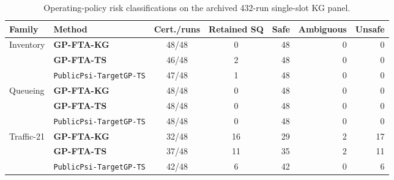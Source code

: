 \begin{table}[htbp]
\centering
\caption{Operating-policy risk classifications on the archived 432-run single-slot KG panel.}\label{tab:operating_policy}
\scriptsize
\begin{tabular}{llccrrr}
\toprule
\textbf{Family} & \textbf{Method} & \textbf{Cert./runs} & \textbf{Retained SQ} & \textbf{Safe} & \textbf{Ambiguous} & \textbf{Unsafe} \\
\midrule
\multirow{3}{*}{Inventory} & \textbf{GP-FTA-KG} & 48/48 & 0 & 48 & 0 & 0 \\
 & \textbf{GP-FTA-TS} & 46/48 & 2 & 48 & 0 & 0 \\
 & \texttt{PublicPsi-TargetGP-TS} & 47/48 & 1 & 48 & 0 & 0 \\
\midrule
\multirow{3}{*}{Queueing} & \textbf{GP-FTA-KG} & 48/48 & 0 & 48 & 0 & 0 \\
 & \textbf{GP-FTA-TS} & 48/48 & 0 & 48 & 0 & 0 \\
 & \texttt{PublicPsi-TargetGP-TS} & 48/48 & 0 & 48 & 0 & 0 \\
\midrule
\multirow{3}{*}{Traffic-21} & \textbf{GP-FTA-KG} & 32/48 & 16 & 29 & 2 & 17 \\
 & \textbf{GP-FTA-TS} & 37/48 & 11 & 35 & 2 & 11 \\
 & \texttt{PublicPsi-TargetGP-TS} & 42/48 & 6 & 42 & 0 & 6 \\
\bottomrule
\end{tabular}
\end{table}